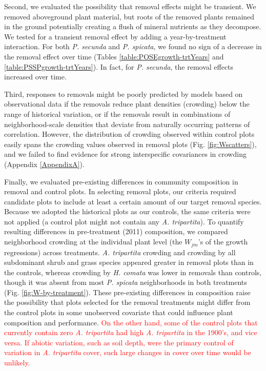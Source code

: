 \documentclass[11pt]{article}
\newcommand{\new}{\textcolor{red}}
\begin{document}
\begin{doublespacing}
Second, we evaluated the possibility that removal effects might be transient. We removed aboveground plant material, but roots of the removed plants remained in the ground potentially creating a flush of mineral nutrients as they decompose. We tested for a transient removal effect by adding a year-by-treatment interaction. For both  \textit{P. secunda}  and \textit{P. spicata}, we found no sign of a decrease in the removal effect over time (Tables \ref{table:POSEgrowth-trtYears} and \ref{table:PSSPgrowth-trtYears}). In fact, for  \textit{P. secunda}, the removal effects increased over time.

Third, responses to removals might be poorly predicted by models based on observational data if the removals reduce plant densities (crowding) below the range of historical variation, or if the removals result in combinations of neighborhood-scale densities that deviate from naturally occurring patterns of correlation. However, the distribution of crowding observed within control plots easily spans the crowding values observed in removal plots (Fig. \ref{fig:Wscatters}), and we failed to find evidence for strong interspecific covariances in crowding (Appendix \ref{AppendixA}).

Finally, we evaluated pre-existing differences in community composition in removal and control plots. In selecting removal plots, our criteria required candidate plots to include at least a certain amount of our target removal species. Because we adopted the historical plots as our controls, the same criteria were not applied (a control plot might not contain any \textit{A. tripartita}). To quantify resulting differences in pre-treatment (2011) composition, we compared neighborhood crowding at the individual plant level (the $W_{jm}$'s of the growth regressions) across treatments. \textit{A. tripartita} crowding and crowding by all subdominant shrub and grass species appeared greater in removal plots than in the controls, whereas crowding by \textit{H. comata} was lower in removals than controls, though it was absent from most \textit{P. spicata} neighborhoods in both treatments (Fig. \ref{fig:W-by-treatment}). These pre-existing differences in composition raise the possibility that plots selected for the removal treatments might differ from the control plots in some unobserved covariate that could influence plant composition and performance. \new{On the other hand, some of the control plots that currently contain zero \textit{A. tripartita} had high \textit{A. tripartita} in the 1900's, and vice versa. If abiotic variation, such as soil depth, were the primary control of variation in \textit{A. tripartita} cover, such large changes in cover over time would be unlikely. }


\end{doublespacing}
\end{document}
